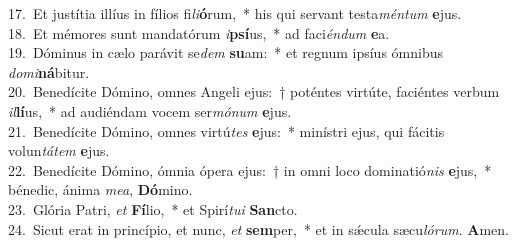 {17.~}Et justítia illíus in fílios fi\textit{li}\textbf{ó}rum,~* his qui servant testa\textit{mén}\textit{tum} \textbf{e}jus.\\
{18.~}Et mémores sunt mandatórum \textit{i}\textbf{psí}us,~* ad faci\textit{én}\textit{dum} \textbf{e}a.\\
{19.~}Dóminus in cælo parávit se\textit{dem} \textbf{su}am:~* et regnum ipsíus ómnibus \textit{do}\textit{mi}\textbf{ná}bitur.\\
{20.~}Benedícite Dómino, omnes Angeli ejus:~† poténtes virtúte, faciéntes verbum \textit{il}\textbf{lí}us,~* ad audiéndam vocem ser\textit{mó}\textit{num} \textbf{e}jus.\\
{21.~}Benedícite Dómino, omnes virtú\textit{tes} \textbf{e}jus:~* minístri ejus, qui fácitis volun\textit{tá}\textit{tem} \textbf{e}jus.\\
{22.~}Benedícite Dómino, ómnia ópera ejus:~† in omni loco dominatió\textit{nis} \textbf{e}jus,~* bénedic, ánima \textit{me}\textit{a}, \textbf{Dó}mino.\\
{23.~}Glória Patri, \textit{et} \textbf{Fí}lio,~* et Spirí\textit{tu}\textit{i} \textbf{San}cto.\\
{24.~}Sicut erat in princípio, et nunc, \textit{et} \textbf{sem}per,~* et in sǽcula sæcu\textit{ló}\textit{rum}. \textbf{A}men.\\
